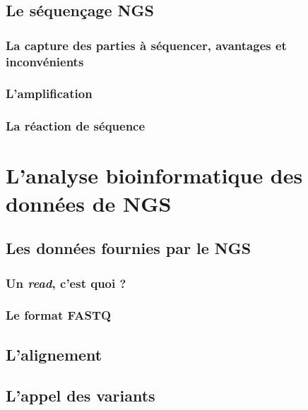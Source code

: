 \documentclass[12pt,a4paper,twoside]{ugathesis}
\begin{document}
\subsection{Le séquençage NGS}\label{ngs}

\subsubsection{La capture des parties à séquencer, avantages et
inconvénients}\label{la-capture-des-parties-a-sequencer-avantages-et-inconvenients}

\subsubsection{L'amplification}\label{lamplification}

\subsubsection{La réaction de séquence}\label{la-reaction-de-sequence}

\section{L'analyse bioinformatique des données de
NGS}\label{lanalyse-bioinformatique-des-donnees-de-ngs}

\subsection{Les données fournies par le
NGS}\label{les-donnees-fournies-par-le-ngs}

\subsubsection{\texorpdfstring{Un \emph{read}, c'est quoi
?}{Un read, c'est quoi ?}}\label{un-read-cest-quoi}

\subsubsection{Le format FASTQ}\label{fastq}

\hypertarget{lalignement}{\subsection{L'alignement}\label{lalignement}}

\hypertarget{varcall}{\subsection{L'appel des variants}\label{varcall}}
\end{document}
